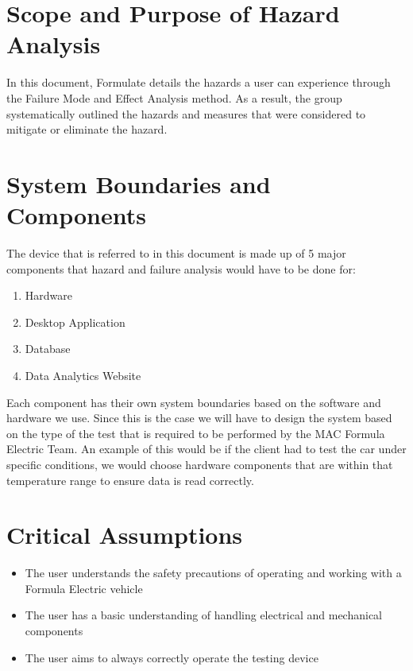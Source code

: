 \documentclass{article}
\begin{document}

\section{Scope and Purpose of Hazard Analysis}

In this document, Formulate details the hazards a user can experience through the Failure Mode and Effect Analysis method. As a result, the group systematically outlined the hazards and measures that were considered to mitigate or eliminate the hazard.

\section{System Boundaries and Components}

The device that is referred to in this document is made up of 5 major components that hazard and failure analysis would have to be done for:

\begin{enumerate}
\item Hardware
\item Desktop Application
\item Database
\item Data Analytics Website 
\end{enumerate}

Each component has their own system boundaries based on the software and hardware we use. Since this is the case we will have to design the system based on the type of the test that is required to be performed by the MAC Formula Electric Team. An example of this would be if the client had to test the car under specific conditions, we would choose hardware components that are within that temperature range to ensure data is read correctly.

\section{Critical Assumptions}

\begin{itemize}
	\item The user understands the safety precautions of operating and working with a Formula Electric vehicle
	\item The user has a basic understanding of handling electrical and mechanical components
	\item The user aims to always correctly operate the testing device
\end{itemize}
\end{document}
